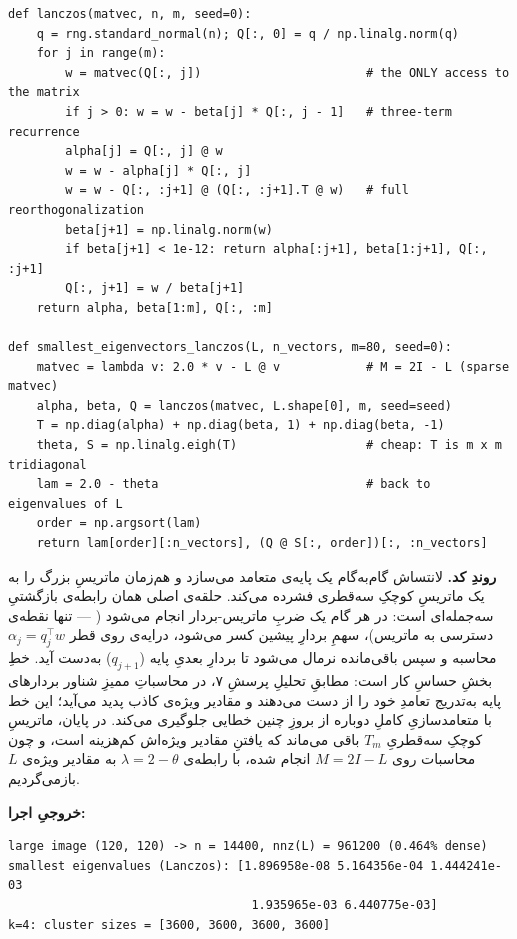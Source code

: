\documentclass[13pt]{extarticle}
\newenvironment{pycode}{\begin{latin}\lstset{style=py}}{\end{latin}}
\newenvironment{consoleout}{\par\smallskip\begin{latin}\lstset{style=out}}{\end{latin}}
\newcommand{\T}{^{\top}}
\newcommand{\file}[1]{\lr{\texttt{#1}}}
\begin{document}
\begin{pycode}
\begin{lstlisting}
def lanczos(matvec, n, m, seed=0):
    q = rng.standard_normal(n); Q[:, 0] = q / np.linalg.norm(q)
    for j in range(m):
        w = matvec(Q[:, j])                       # the ONLY access to the matrix
        if j > 0: w = w - beta[j] * Q[:, j - 1]   # three-term recurrence
        alpha[j] = Q[:, j] @ w
        w = w - alpha[j] * Q[:, j]
        w = w - Q[:, :j+1] @ (Q[:, :j+1].T @ w)   # full reorthogonalization
        beta[j+1] = np.linalg.norm(w)
        if beta[j+1] < 1e-12: return alpha[:j+1], beta[1:j+1], Q[:, :j+1]
        Q[:, j+1] = w / beta[j+1]
    return alpha, beta[1:m], Q[:, :m]

def smallest_eigenvectors_lanczos(L, n_vectors, m=80, seed=0):
    matvec = lambda v: 2.0 * v - L @ v            # M = 2I - L (sparse matvec)
    alpha, beta, Q = lanczos(matvec, L.shape[0], m, seed=seed)
    T = np.diag(alpha) + np.diag(beta, 1) + np.diag(beta, -1)
    theta, S = np.linalg.eigh(T)                  # cheap: T is m x m tridiagonal
    lam = 2.0 - theta                             # back to eigenvalues of L
    order = np.argsort(lam)
    return lam[order][:n_vectors], (Q @ S[:, order])[:, :n_vectors]
\end{lstlisting}
\end{pycode}

\noindent\textbf{روندِ کد.} لانتساش گام‌به‌گام یک پایه‌ی متعامد می‌سازد و هم‌زمان ماتریسِ بزرگ را به یک ماتریسِ کوچکِ سه‌قطری فشرده می‌کند. حلقه‌ی اصلی همان رابطه‌ی بازگشتیِ سه‌جمله‌ای است: در هر گام یک ضربِ ماتریس-بردار انجام می‌شود (\file{matvec} --- تنها نقطه‌ی دسترسی به ماتریس)، سهمِ بردارِ پیشین کسر می‌شود، درایه‌ی روی قطر $\alpha_j=q_j\T w$ محاسبه و سپس باقی‌مانده نرمال می‌شود تا بردارِ بعدیِ پایه ($q_{j+1}$) به‌دست آید. خطِ \file{w = w - Q[:, :j+1] @ (Q[:, :j+1].T @ w)} بخشِ حساسِ کار است: مطابقِ تحلیلِ پرسشِ ۷، در محاسباتِ ممیزِ شناور بردارهای پایه به‌تدریج تعامدِ خود را از دست می‌دهند و مقادیر ویژه‌ی کاذب پدید می‌آید؛ این خط با متعامدسازیِ کاملِ دوباره از بروزِ چنین خطایی جلوگیری می‌کند. در پایان، ماتریسِ کوچکِ سه‌قطریِ $T_m$ باقی می‌ماند که یافتنِ مقادیر ویژه‌اش کم‌هزینه است، و چون محاسبات روی $M=2I-L$ انجام شده، با رابطه‌ی $\lambda=2-\theta$ به مقادیر ویژه‌ی $L$ بازمی‌گردیم.

\smallskip
\noindent\textbf{خروجیِ اجرا:}
\begin{consoleout}
\begin{lstlisting}
large image (120, 120) -> n = 14400, nnz(L) = 961200 (0.464% dense)
smallest eigenvalues (Lanczos): [1.896958e-08 5.164356e-04 1.444241e-03
                                  1.935965e-03 6.440775e-03]
k=4: cluster sizes = [3600, 3600, 3600, 3600]
\end{lstlisting}
\end{consoleout}
\end{document}
